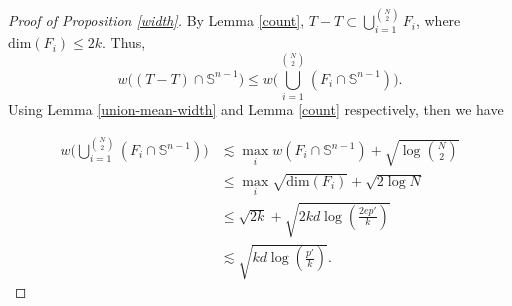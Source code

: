 \documentclass{article}
\begin{document}
\begin{proof} [Proof of Proposition \ref{width}]

By Lemma \ref{count}, $T-T \subset \bigcup_{i=1}^{{N \choose 2}} F_i$, where $\mathrm{dim}(F_i) \leq 2k$. Thus,
\begin{equation}
    w\big((T-T) \cap \mathbb{S}^{n-1}\big) \leq w\big( \bigcup_{i=1}^{N \choose 2} (F_i \cap \mathbb{S}^{n-1}) \big).
\end{equation}
Using Lemma \ref{union-mean-width} and Lemma \ref{count} respectively, then we have

    \begin{align}
        w\big( \bigcup_{i=1}^{N \choose 2} (F_i \cap \mathbb{S}^{n-1}) \big) & \lesssim \max_{i} w(F_i \cap \mathbb{S}^{n-1}) + \sqrt{\log {N \choose 2}} \\
        & \leq \max_{i} \sqrt{\mathrm{dim}(F_i)} + \sqrt{2 \log N} \\
        & \leq \sqrt{2k} + \sqrt{2kd \log(\frac{2ep'}{k})} \\
        & \lesssim \sqrt{kd \log (\frac{p'}{k})}.
    \end{align}

\end{proof}
\end{document}
